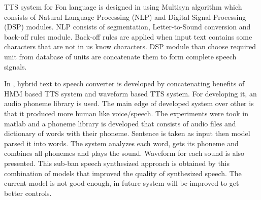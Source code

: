 TTS system for Fon language is designed in \cite{dagba2014text} using Multisyn algorithm \cite{clark2007multisyn}
which consists of Natural Language Processing (NLP) and Digital Signal Processing (DSP)
modules. NLP consists of segmentation, Letter-to-Sound conversion and back-off rules module.
Back-off rules are applied when input text contains some characters that are not in us know
characters. DSP module than choose required unit from database of units are concatenate them to
form complete speech signals.

In \cite{ganai2016text}, hybrid text to speech converter is developed by
concatenating benefits of HMM based TTS system and waveform based TTS system. For developing it, an audio phoneme library is used. The main
edge of developed system over other is that it produced more human like voice/speech. The experiments were took in
matlab and a phoneme library is developed that consists of audio files and dictionary of words with their phoneme. Sentence is
taken as input then model parsed it into words. The system analyzes each word, gets its phoneme and combines all phonemes
and plays the sound. Waveform for each sound is also presented. This sub-ban speech synthesized approach is obtained by
this combination of models that improved the quality of synthesized speech. The current model is not good enough, in future
system will be improved to get better controls.

